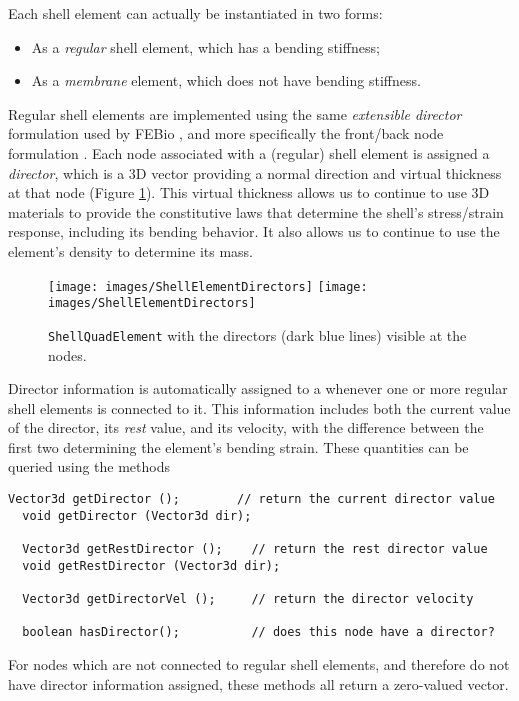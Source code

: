 Each shell element can actually be instantiated in two forms:

\begin{itemize}

\item As a {\it regular} shell element, which has a bending stiffness;

\item As a {\it membrane} element, which does not have bending
stiffness.

\end{itemize}

Regular shell elements are implemented using the same {\it
extensible director} formulation used by FEBio \cite{MaasFEBio2012},
and more specifically the front/back node formulation
\cite{FEBioTheory2018}.  Each node associated with a (regular)
shell element is assigned a {\it director}, which is a 3D vector
providing a normal direction and virtual thickness at that node
(Figure \ref{ShellElementDirectors:fig}). This virtual thickness
allows us to continue to use 3D materials to provide
the constitutive laws that determine the
shell's stress/strain response, including its bending behavior. It
also allows us to continue to use the element's {\sf density} to
determine its mass.

\begin{figure}[ht]
\begin{center}
\iflatexml
 \texttt{[image: images/ShellElementDirectors]}
\else
 \texttt{[image: images/ShellElementDirectors]}
\fi
\end{center}
\caption{{\tt ShellQuadElement} with the directors (dark blue lines)
visible at the nodes.}
\label{ShellElementDirectors:fig}
\end{figure}

Director information is automatically assigned to a
 whenever one or more
regular shell elements is connected to it. This information includes both the
current value of the director, its {\it rest} value, and its velocity,
with the difference between the first two determining the element's
bending strain.  These quantities can be queried using the methods
%
\begin{lstlisting}[]
  Vector3d getDirector ();        // return the current director value
  void getDirector (Vector3d dir);

  Vector3d getRestDirector ();    // return the rest director value
  void getRestDirector (Vector3d dir);

  Vector3d getDirectorVel ();     // return the director velocity

  boolean hasDirector();          // does this node have a director?
\end{lstlisting}
%
For nodes which are not connected to regular shell elements, and
therefore do not have director information assigned, these methods all
return a zero-valued vector.

